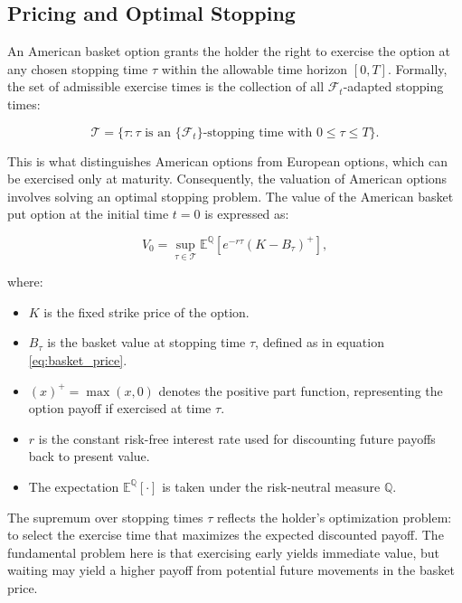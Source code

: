 \documentclass[titlepage]{article}
\begin{document}
\subsection{Pricing and Optimal Stopping}

An American basket option grants the holder the right to exercise the option at any chosen stopping time \(\tau\) within the allowable time horizon \([0, T]\). Formally, the set of admissible exercise times is the collection of all \(\mathcal{F}_t\)-adapted stopping times:

\[
\mathcal{T} = \{\tau : \tau \text{ is an } \{\mathcal{F}_t\}\text{-stopping time with } 0 \leq \tau \leq T\}.
\]

This is what distinguishes American options from European options, which can be exercised only at maturity. Consequently, the valuation of American options involves solving an optimal stopping problem. The value of the American basket put option at the initial time \( t=0 \) is expressed as:

\begin{equation}
V_0 = \sup_{\tau \in \mathcal{T}} \mathbb{E}^{\mathbb{Q}}\left[e^{-r \tau} (K - B_\tau)^+\right],
\label{eq:american_option_value}
\end{equation}

where:

\begin{itemize}
    \item \( K \) is the fixed strike price of the option.
    \item \( B_\tau \) is the basket value at stopping time \(\tau\), defined as in equation \eqref{eq:basket_price}.
    \item \( (x)^+ = \max(x, 0) \) denotes the positive part function, representing the option payoff if exercised at time \(\tau\).
    \item \( r \) is the constant risk-free interest rate used for discounting future payoffs back to present value.
    \item The expectation \(\mathbb{E}^{\mathbb{Q}}[\cdot]\) is taken under the risk-neutral measure \(\mathbb{Q}\).
\end{itemize}

The supremum over stopping times \(\tau\) reflects the holder’s optimization problem: to select the exercise time that maximizes the expected discounted payoff. The fundamental problem here is that exercising early yields immediate value, but waiting may yield a higher payoff from potential future movements in the basket price.
\end{document}
